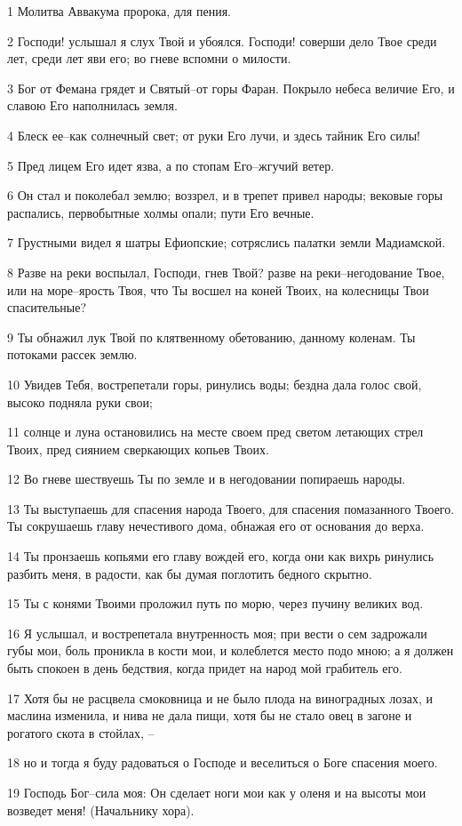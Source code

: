 \par 1 Молитва Аввакума пророка, для пения.
\par 2 Господи! услышал я слух Твой и убоялся. Господи! соверши дело Твое среди лет, среди лет яви его; во гневе вспомни о милости.
\par 3 Бог от Фемана грядет и Святый--от горы Фаран. Покрыло небеса величие Его, и славою Его наполнилась земля.
\par 4 Блеск ее--как солнечный свет; от руки Его лучи, и здесь тайник Его силы!
\par 5 Пред лицем Его идет язва, а по стопам Его--жгучий ветер.
\par 6 Он стал и поколебал землю; воззрел, и в трепет привел народы; вековые горы распались, первобытные холмы опали; пути Его вечные.
\par 7 Грустными видел я шатры Ефиопские; сотряслись палатки земли Мадиамской.
\par 8 Разве на реки воспылал, Господи, гнев Твой? разве на реки--негодование Твое, или на море--ярость Твоя, что Ты восшел на коней Твоих, на колесницы Твои спасительные?
\par 9 Ты обнажил лук Твой по клятвенному обетованию, данному коленам. Ты потоками рассек землю.
\par 10 Увидев Тебя, вострепетали горы, ринулись воды; бездна дала голос свой, высоко подняла руки свои;
\par 11 солнце и луна остановились на месте своем пред светом летающих стрел Твоих, пред сиянием сверкающих копьев Твоих.
\par 12 Во гневе шествуешь Ты по земле и в негодовании попираешь народы.
\par 13 Ты выступаешь для спасения народа Твоего, для спасения помазанного Твоего. Ты сокрушаешь главу нечестивого дома, обнажая его от основания до верха.
\par 14 Ты пронзаешь копьями его главу вождей его, когда они как вихрь ринулись разбить меня, в радости, как бы думая поглотить бедного скрытно.
\par 15 Ты с конями Твоими проложил путь по морю, через пучину великих вод.
\par 16 Я услышал, и вострепетала внутренность моя; при вести о сем задрожали губы мои, боль проникла в кости мои, и колеблется место подо мною; а я должен быть спокоен в день бедствия, когда придет на народ мой грабитель его.
\par 17 Хотя бы не расцвела смоковница и не было плода на виноградных лозах, и маслина изменила, и нива не дала пищи, хотя бы не стало овец в загоне и рогатого скота в стойлах, --
\par 18 но и тогда я буду радоваться о Господе и веселиться о Боге спасения моего.
\par 19 Господь Бог--сила моя: Он сделает ноги мои как у оленя и на высоты мои возведет меня! (Начальнику хора).


